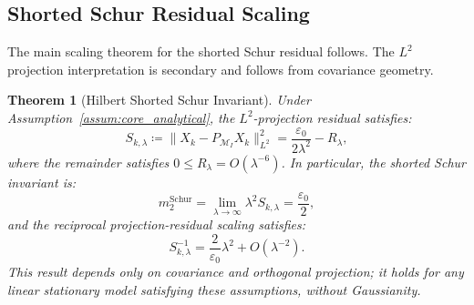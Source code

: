 \documentclass[preprint,12pt]{elsarticle}
\theoremstyle{plain}
\newtheorem{theorem}{Theorem}
\theoremstyle{definition}
\theoremstyle{remark}
\begin{document}
    \subsection{Shorted Schur Residual Scaling}
    \label{sec:infdim:scaling}

    The main scaling theorem for the shorted Schur residual follows. The $L^2$ projection interpretation is secondary and follows from covariance geometry.

    \begin{theorem}[Hilbert Shorted Schur Invariant]
        \label{thm:inf_cancellation}
        Under Assumption~\ref{assum:core_analytical}, the $L^2$-projection residual satisfies:
        \begin{equation}
            \label{eq:main_schur_sharp}
            S_{k,\lambda} \coloneqq \|X_k - P_{\mathcal{M}_I} X_k\|_{L^2}^2 = \frac{\varepsilon_0}{2\lambda^2} - R_\lambda,
        \end{equation}
        where the remainder satisfies $0 \le R_\lambda = O(\lambda^{-6})$. In particular, the shorted Schur invariant is:
        \begin{equation}
            \label{eq:m2_schur_value}
            m_2^{\mathrm{Schur}} = \lim_{\lambda\to\infty} \lambda^2 S_{k,\lambda} = \frac{\varepsilon_0}{2},
        \end{equation}
        and the reciprocal projection-residual scaling satisfies:
        \begin{equation}
            \label{eq:schur_scaling_inverse}
            S_{k,\lambda}^{-1} = \frac{2}{\varepsilon_0}\lambda^2 + O(\lambda^{-2}).
        \end{equation}
        This result depends only on covariance and orthogonal projection; it holds for any linear stationary model satisfying these assumptions, without Gaussianity.
    \end{theorem}
\end{document}
